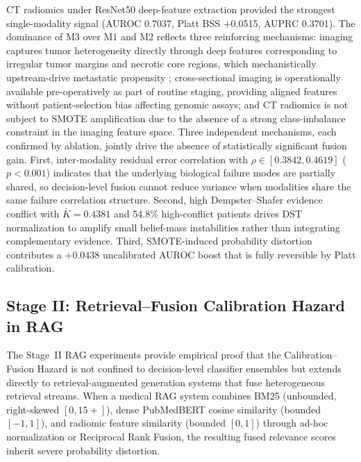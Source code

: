 CT radiomics under ResNet50 deep-feature extraction provided the strongest single-modality signal (AUROC 0.7037, Platt BSS +0.0515, AUPRC 0.3701). The dominance of M3 over M1 and M2 reflects three reinforcing mechanisms: imaging captures tumor heterogeneity directly through deep features corresponding to irregular tumor margins and necrotic core regions, which mechanistically upstream-drive metastatic propensity \cite{chi2026multimodal, nazari2020ct}; cross-sectional imaging is operationally available pre-operatively as part of routine staging, providing aligned features without patient-selection bias affecting genomic assays; and CT radiomics is not subject to SMOTE amplification due to the absence of a strong class-imbalance constraint in the imaging feature space. Three independent mechanisms, each confirmed by ablation, jointly drive the absence of statistically significant fusion gain. First, inter-modality residual error correlation with $\rho \in [0.3842, 0.4619]$ ($p < 0.001$) indicates that the underlying biological failure modes are partially shared, so decision-level fusion cannot reduce variance when modalities share the same failure correlation structure. Second, high Dempster--Shafer evidence conflict with $\bar{K} = 0.4381$ and 54.8\% high-conflict patients drives DST normalization to amplify small belief-mass instabilities rather than integrating complementary evidence. Third, SMOTE-induced probability distortion contributes a $+0.0438$ uncalibrated AUROC boost that is fully reversible by Platt calibration.

\subsection{Stage II: Retrieval--Fusion Calibration Hazard in RAG}

The Stage~II RAG experiments provide empirical proof that the Calibration--Fusion Hazard is not confined to decision-level classifier ensembles but extends directly to retrieval-augmented generation systems that fuse heterogeneous retrieval streams. When a medical RAG system combines BM25 (unbounded, right-skewed $[0, 15+]$), dense PubMedBERT cosine similarity (bounded $[-1,1]$), and radiomic feature similarity (bounded $[0,1]$) through ad-hoc normalization or Reciprocal Rank Fusion, the resulting fused relevance scores inherit severe probability distortion.

